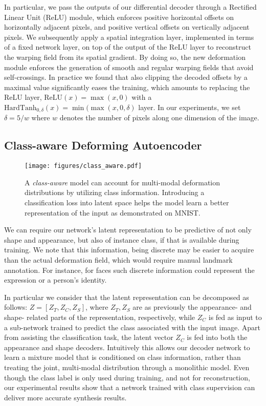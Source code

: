 \documentclass[runningheads]{llncs}
\begin{document}
In particular, we pass the outputs of our differential decoder through a Rectified Linear Unit (ReLU) module, which enforces positive horizontal offsets on horizontally adjacent pixels,
and positive vertical offsets on vertically adjacent pixels. 
We subsequently apply a spatial integration layer, implemented in terms of a fixed network layer, on top of the output of the ReLU layer to reconstruct the warping field from its spatial gradient. By doing so, the new deformation module enforces the generation of smooth and regular warping fields that avoid self-crossings.  
In practice we found that also clipping  the decoded offsets by a maximal value significantly eases the training, which amounts to replacing the ReLU layer, $\mathrm{ReLU}(x) = \max(x,0)$ with a  $\mathrm{HardTanh}_{0,\delta}(x) = \min(\max(x,0,\delta)$ layer. In our experiments, we set $\delta = 5/w$ where $w$ denotes the number of pixels along one dimension of the image.


\subsection{Class-aware Deforming Autoencoder}
\label{section:class-aware}
\label{class}
\begin{figure}[ht!]
 \vspace{-0.25cm}
    \centering
    \texttt{[image: figures/class\_aware.pdf]}
    \caption{A \emph{class-aware} model can account for multi-modal   deformation distributions by utilizing class
        information. Introducing a classification loss into latent space
        helps the model learn a better representation of the input as demonstrated on MNIST.}
    \label{fig:EncDecInject}
\end{figure}

 We can require our network's latent representation to be predictive of not only shape and appearance, but also of instance class, if that is available during training. We note that this information, being discrete may be  easier to acquire than the actual deformation field, which would require manual landmark annotation. For instance, for faces such discrete information could represent the expression or a person's identity. 
 
In particular we consider that the latent representation can be decomposed as follows:
$Z = [Z_T,Z_C,Z_S]$, where $Z_T,Z_S$ are as previously the appearance- and shape- related parts of the representation, respectively, while $Z_C$ is fed as input to a sub-network  trained to predict the class associated with the input image. Apart from assisting the classification task, the latent vector $Z_C$ is fed into both the appearance and shape decoders. 
Intuitively this allows our decoder network to learn a mixture model that is conditioned on class information,
rather than treating the joint, multi-modal distribution through a monolithic model. Even though the class label is only used during training, and not for reconstruction, our experimental results show that a network trained with class supervision can deliver more accurate synthesis results.
\end{document}
